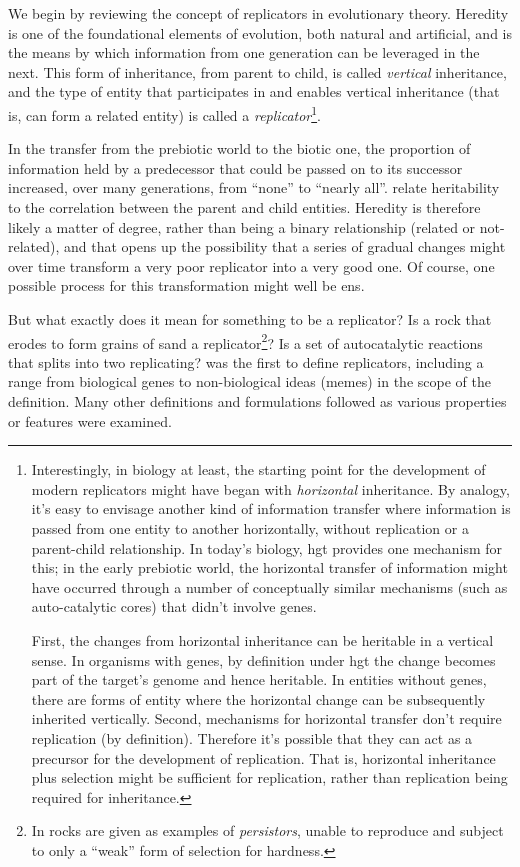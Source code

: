 We begin by reviewing the concept of replicators in evolutionary theory. Heredity is one of the foundational elements of evolution, both natural and artificial, and is the means by which information from one generation can be leveraged in the next. This form of inheritance, from parent to child, is called \emph{vertical} inheritance, and the type of entity that participates in and enables vertical inheritance (that is, can form a related entity) is called a \emph{replicator}\footnote{Interestingly, in biology at least, the starting point for the development of modern replicators might have began with \emph{horizontal} inheritance. By analogy, it’s easy to envisage another kind of information transfer where information is passed from one entity to another horizontally, without replication or a parent-child relationship. In today’s biology, \gls{hgt} provides one mechanism for this; in the early prebiotic world, the horizontal transfer of information might have occurred through a number of conceptually similar mechanisms (such as auto-catalytic cores) that didn’t involve genes. 
	
	First, the changes from horizontal inheritance can be heritable in a vertical sense. In organisms with genes, by definition under \gls{hgt} the change becomes part of the target’s genome and hence heritable. In entities without genes, there are forms of entity where the horizontal change can be subsequently inherited vertically. Second, mechanisms for horizontal transfer don’t require replication (by definition). Therefore it’s possible that they can act as a precursor for the development of replication. That is, horizontal inheritance plus selection might be sufficient for replication, rather than replication being required for inheritance.}. 

In the transfer from the prebiotic world to the biotic one, the proportion of information held by a predecessor that could be passed on to its successor increased, over many generations, from ``none'' to ``nearly all''. \Textcite{Vasas2012a} relate heritability to the correlation between the parent and child entities. Heredity is therefore likely a matter of degree, rather than being a binary relationship (related or not-related), and that opens up the possibility that a series of gradual changes might over time transform a very poor replicator into a very good one. Of course, one possible process for this transformation might well be \gls{ens}.

But what exactly does it mean for something to be a replicator? Is a rock that erodes to form grains of sand a replicator\footnote{In \textcite{Bourrat2015} rocks are given as examples of \emph{persistors}, unable to reproduce and subject to only a ``weak'' form of selection for hardness.}? Is a set of autocatalytic reactions that splits into two replicating? \Textcite{Dawkins1976} was the first to define replicators, including a range from biological genes to non-biological ideas (memes) in the scope of the definition. Many other definitions and formulations followed as various properties or features were examined. 

